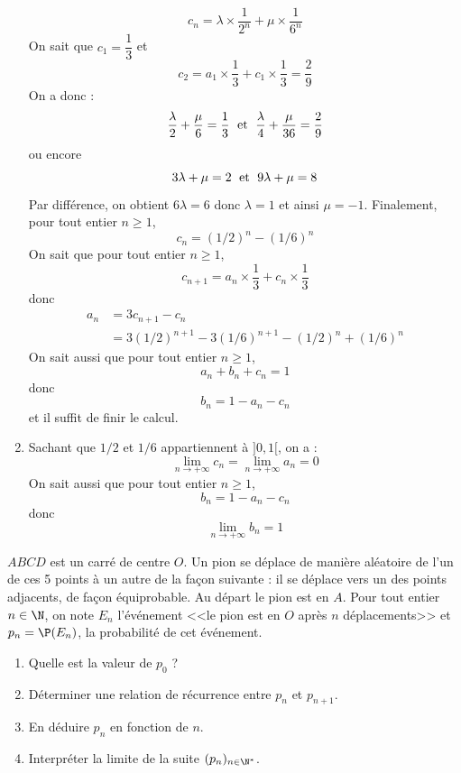 \documentclass[a4paper,10pt]{report}
\begin{document}
\begin{enumerate}
$$ c_n = \lambda \times \dfrac{1}{2^n} + \mu \times \dfrac{1}{6^n}$$
On sait que $c_1= \dfrac{1}{3}$ et 
$$ c_2 = a_1 \times \dfrac{1}{3} + c_1 \times \dfrac{1}{3} = \dfrac{2}{9}$$
On a donc :
$$ \dfrac{\lambda}{2} + \dfrac{\mu}{6} = \dfrac{1}{3} \; \hbox{ et } \; \dfrac{\lambda}{4} + \dfrac{\mu}{36} = \dfrac{2}{9}$$
ou encore 
$$ 3 \lambda + \mu = 2 \; \hbox{ et } \; 9 \lambda + \mu = 8$$
Par différence, on obtient $6 \lambda = 6$ donc $\lambda=1$ et ainsi $\mu=-1$. Finalement, pour tout entier $n \geq 1$,
$$c_n = (1/2)^n-(1/6)^n$$
On sait que pour tout entier $n \geq 1$,
$$c_{n+1} = a_n \times \dfrac{1}{3} + c_n \times \dfrac{1}{3}$$
donc 
\begin{align*}
 a_n & = 3c_{n+1}-c_n  \\
 & = 3 (1/2)^{n+1}-3(1/6)^{n+1} - (1/2)^n+(1/6)^n
 \end{align*}
On sait aussi que pour tout entier $n \geq 1$,
$$ a_n + b_n + c_n  = 1$$
donc 
$$ b_n = 1-a_n -c_n$$
et il suffit de finir le calcul.
\item Sachant que $1/2$ et $1/6$ appartiennent à $]0,1[$, on a :
$$ \lim_{n \rightarrow + \infty} c_n =  \lim_{n \rightarrow + \infty} a_n = 0$$
On sait aussi que pour tout entier $n \geq 1$,
$$  b_n = 1-a_n -c_n$$
donc 
$$\lim_{n \rightarrow + \infty} b_n = 1$$
\end{enumerate}


\begin{Exa} $ABCD$ est un carré de centre $O$. Un pion se déplace de manière aléatoire de l'un de ces 5 points à un autre de la façon suivante : il se déplace vers un des points adjacents, de façon équiprobable. Au départ le pion est en $A$. Pour tout entier $n \in \N$, on note $E_n$ l'événement <<le pion est en $O$ après $n$ déplacements>> et $p_n = \P(E_n)$, la probabilité de cet événement.
\begin{center}\end{center}
\begin{enumerate}
 \item Quelle est la valeur de $p_0$ ?
 \item Déterminer une relation de récurrence entre $p_n$ et $p_{n+1}$.
 \item En déduire $p_n$ en fonction de $n$.
 \item Interpréter la limite de la suite $(p_n)_{n\in \N^*}$.
\end{enumerate}
\end{Exa}
\end{document}
